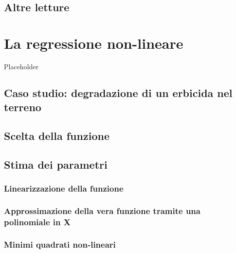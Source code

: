 \documentclass[a4paper,12pt,oneside]{book}
\begin{document}
\hypertarget{altre-letture-10}{%
\section{Altre letture}\label{altre-letture-10}}

\hypertarget{la-regressione-non-lineare}{%
\chapter{La regressione non-lineare}\label{la-regressione-non-lineare}}

Placeholder

\hypertarget{caso-studio-degradazione-di-un-erbicida-nel-terreno}{%
\section{Caso studio: degradazione di un erbicida nel terreno}\label{caso-studio-degradazione-di-un-erbicida-nel-terreno}}

\hypertarget{scelta-della-funzione}{%
\section{Scelta della funzione}\label{scelta-della-funzione}}

\hypertarget{stima-dei-parametri-3}{%
\section{Stima dei parametri}\label{stima-dei-parametri-3}}

\hypertarget{linearizzazione-della-funzione}{%
\subsection{Linearizzazione della funzione}\label{linearizzazione-della-funzione}}

\hypertarget{approssimazione-della-vera-funzione-tramite-una-polinomiale-in-x}{%
\subsection{Approssimazione della vera funzione tramite una polinomiale in X}\label{approssimazione-della-vera-funzione-tramite-una-polinomiale-in-x}}

\hypertarget{minimi-quadrati-non-lineari}{%
\subsection{Minimi quadrati non-lineari}\label{minimi-quadrati-non-lineari}}
\end{document}
